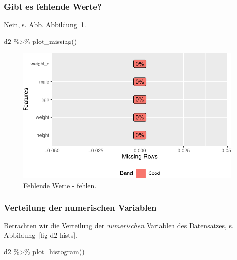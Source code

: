 \documentclass[
  a4paper,
  DIV=11]{scrreprt}
\newenvironment{Shaded}{\begin{snugshade}}{\end{snugshade}}
\newcommand{\FunctionTok}[1]{\textcolor[rgb]{0.28,0.35,0.67}{#1}}
\newcommand{\NormalTok}[1]{\textcolor[rgb]{0.00,0.23,0.31}{#1}}
\newcommand{\SpecialCharTok}[1]{\textcolor[rgb]{0.37,0.37,0.37}{#1}}
\theoremstyle{definition}
\theoremstyle{remark}
\begin{document}
\hypertarget{gibt-es-fehlende-werte}{%
\subsubsection{Gibt es fehlende Werte?}\label{gibt-es-fehlende-werte}}

Nein, s. Abb. Abbildung~\ref{fig-na}.

\begin{Shaded}
\begin{Highlighting}[]
\NormalTok{d2 }\SpecialCharTok{\%\textgreater{}\%} \FunctionTok{plot\_missing}\NormalTok{()}
\end{Highlighting}
\end{Shaded}

\begin{figure}[H]

{\centering \includegraphics{./lineare-modelle_files/figure-pdf/fig-na-1.pdf}

}

\caption{\label{fig-na}Fehlende Werte - fehlen.}

\end{figure}

\hypertarget{verteilung-der-numerischen-variablen}{%
\subsubsection{Verteilung der numerischen
Variablen}\label{verteilung-der-numerischen-variablen}}

Betrachten wir die Verteilung der \emph{numerischen} Variablen des
Datensatzes, s. Abbildung~\ref{fig-d2-hists}.

\begin{Shaded}
\begin{Highlighting}[]
\NormalTok{d2 }\SpecialCharTok{\%\textgreater{}\%} \FunctionTok{plot\_histogram}\NormalTok{()}
\end{Highlighting}
\end{Shaded}
\end{document}

